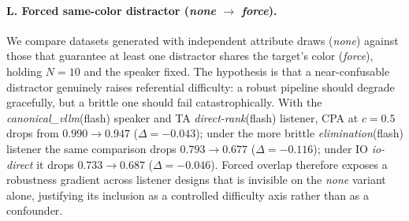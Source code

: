\paragraph{L. Forced same-color distractor
            (\textit{none} $\to$ \textit{force}).}
We compare datasets generated with independent attribute draws
(\textit{none}) against those that guarantee at least one distractor
shares the target's color (\textit{force}), holding $N{=}10$ and the
speaker fixed.
The hypothesis is that a near-confusable distractor genuinely raises
referential difficulty: a robust pipeline should degrade gracefully, but
a brittle one should fail catastrophically.
With the \textit{canonical\_vllm}(flash) speaker and TA
\textit{direct-rank}(flash) listener, CPA at $c{=}0.5$ drops from
$0.990 \to 0.947$ ($\Delta {=} {-}0.043$); under the more brittle
\textit{elimination}(flash) listener the same comparison drops
$0.793 \to 0.677$ ($\Delta {=} {-}0.116$); under IO \textit{io-direct} it
drops $0.733 \to 0.687$ ($\Delta {=} {-}0.046$).
Forced overlap therefore exposes a robustness gradient across listener
designs that is invisible on the \textit{none} variant alone, justifying
its inclusion as a controlled difficulty axis rather than as a
confounder.


